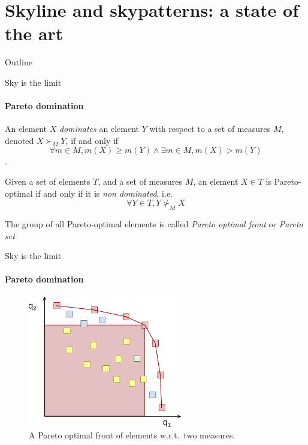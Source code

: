 \documentclass{beamer}
\begin{document}
\section{Skyline and skypatterns: a state of the art}
\begin{frame}{Outline}
  \tableofcontents[currentsection]
\end{frame}


\begin{frame}{Sky is the limit}
  \framesubtitle{Pareto domination}
  \begin{definition}
  \label{def:pareto}
  An element $X$ \emph{dominates} an element
  $Y$ with respect to a set of measures
  $M$, denoted $X \succ_M Y$, if and only if $$\forall m \in M, m(X)
  \geq m(Y) \wedge \exists m \in M, m(X) > m(Y)$$.
 \end{definition}
 \pause
 \begin{definition}
  Given a set of elements $T$, and a set of
  measures $M$, an element $X \in T$ is Pareto-optimal if and only if it is \emph{non dominated}, i.e.\
    $$\forall Y \in T, Y \nsucc_M X $$
  \end{definition}
The group of all Pareto-optimal elements is called \emph{Pareto optimal front} or \emph{Pareto set}
\end{frame}

\begin{frame}{Sky is the limit}
  \framesubtitle{Pareto domination}
  \begin{figure}[htp]
    \centering
    \includegraphics[width=0.6\textwidth]{domination2.pdf}
    \caption{A Pareto optimal front of elements w.r.t.\ two measures.}
  \end{figure}  
\end{frame}
\end{document}

